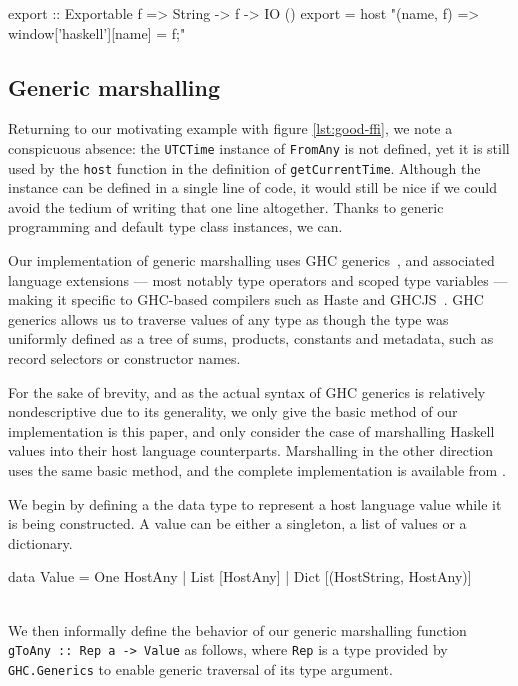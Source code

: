\documentclass[preprint]{sigplanconf}
\begin{document}
\begin{code}
  export :: Exportable f => String -> f -> IO ()
  export =
    host "(name, f) => {window['haskell'][name] = f;}"
\end{code}

\subsection{Generic marshalling}
\label{sec:default-instances}
Returning to our motivating example with figure \ref{lst:good-ffi}, we note
a conspicuous absence: the \lstinline!UTCTime! instance of \lstinline!FromAny!
is not defined, yet it is still used by the \lstinline!host! function in the
definition of \lstinline!getCurrentTime!. Although the instance can be defined
in a single line of code, it would still be nice if we could avoid the tedium
of writing that one line altogether. Thanks to generic programming and default
type class instances, we can.

Our implementation of generic marshalling uses GHC generics\ \cite{generics},
and associated language extensions --- most notably type operators and scoped
type variables --- making it specific to GHC-based compilers such as Haste and
GHCJS\ \cite{ghcjs}. GHC generics allows us to traverse values of any type
as though the type was uniformly defined as a tree of sums, products,
constants and metadata, such as record selectors or constructor names.

For the sake of brevity, and as the actual syntax of GHC generics is
relatively nondescriptive due to its generality, we only give the basic method
of our implementation is this paper, and only consider the case of marshalling
Haskell values into their host language counterparts.
Marshalling in the other direction uses the same basic method,
and the complete implementation is available from \cite{haste-lang.org}.

We begin by defining a the data type to represent a host language value while
it is being constructed. A value can be either a singleton, a list of
values or a dictionary.\\
\begin{code}
  data Value
    = One HostAny
    | List [HostAny]
    | Dict [(HostString, HostAny)]
\end{code}\\
We then informally define the behavior of our generic marshalling function
\lstinline!gToAny :: Rep a -> Value! as follows, where \lstinline!Rep! is
a type provided by \lstinline!GHC.Generics! to enable generic traversal
of its type argument.
\end{document}
